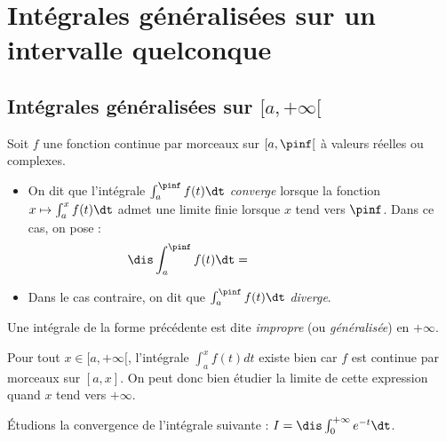 \documentclass[a4paper,10pt]{report}
\begin{document}
\section{Intégrales généralisées sur un intervalle quelconque}
\subsection{Intégrales généralisées sur $[a, + \infty[$}

\begin{defin}
Soit $f$ une fonction continue par morceaux sur $[a,\pinf[$ à valeurs réelles ou complexes.
\begin{itemize}
\item On dit que l'intégrale $\int_a^\pinf f(t)\dt$ \textit{converge} lorsque la fonction $x \mapsto \int_a^x f(t) \dt$ admet une limite finie lorsque $x$ tend vers $\pinf$. Dans ce cas, on pose :
\[ \dis \int_a^\pinf f(t) \dt = \phantom{\lim_{x\to \pinf} \int_a^x f(t)\dt} \]
\item Dans le cas contraire, on dit que $\int_a^\pinf f(t)\dt$ \textit{diverge}.
\end{itemize}
\end{defin}

\noindent Une intégrale de la forme précédente est dite \textit{impropre} (ou \textit{généralisée}) en $+ \infty$.

\medskip

\begin{rem} 
Pour tout $x \in [a, + \infty[$, l'intégrale $\int_{a}^x f(t) dt$ existe bien car $f$ est continue par morceaux sur $[a,x]$. On peut donc bien étudier la limite de cette expression quand $x$ tend vers $+\infty$.
\end{rem}

\medskip

\begin{ex}
Étudions la convergence de l'intégrale suivante : $I = \dis \int_{0}^{+ \infty} e^{-t} \dt$. 


\vspace{6cm}
\end{ex} 
\end{document}
